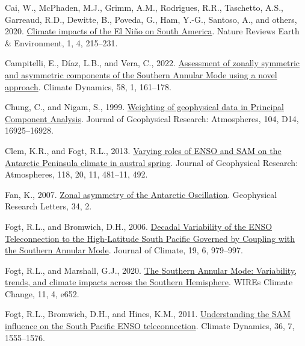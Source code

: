 \documentclass[12pt,oneside]{reedthesis}
\newlength{\cslhangindent}
\newenvironment{CSLReferences}[2] %
 {%
  \setlength{\parindent}{0pt}
  \ifodd #1 \everypar{\setlength{\hangindent}{\cslhangindent}}\ignorespaces\fi
  \ifnum #2 > 0
  \setlength{\parskip}{#2\baselineskip}
  \fi
 }%
 {}
\begin{document}
\begin{CSLReferences}{1}{0}
\leavevmode{}%
Cai, W., McPhaden, M.J., Grimm, A.M., Rodrigues, R.R., Taschetto, A.S., Garreaud, R.D., Dewitte, B., Poveda, G., Ham, Y.-G., Santoso, A., and others, 2020. \href{https://doi.org/10.1038/s43017-020-0040-3}{Climate impacts of the {El Niño} on {South America}}. Nature Reviews Earth \& Environment, 1, 4, 215--231.

\leavevmode{}%
Campitelli, E., Díaz, L.B., and Vera, C., 2022. \href{https://doi.org/10.1007/s00382-021-05896-5}{Assessment of zonally symmetric and asymmetric components of the {Southern Annular Mode} using a novel approach}. Climate Dynamics, 58, 1, 161--178.

\leavevmode{}%
Chung, C., and Nigam, S., 1999. \href{https://doi.org/10.1029/1999JD900234}{Weighting of geophysical data in {Principal Component Analysis}}. Journal of Geophysical Research: Atmospheres, 104, D14, 16925--16928.

\leavevmode{}%
Clem, K.R., and Fogt, R.L., 2013. \href{https://doi.org/10.1002/jgrd.50860}{Varying roles of {ENSO} and {SAM} on the {Antarctic Peninsula} climate in austral spring}. Journal of Geophysical Research: Atmospheres, 118, 20, 11, 481--11, 492.

\leavevmode{}%
Fan, K., 2007. \href{https://doi.org/10.1029/2006GL028045}{Zonal asymmetry of the {Antarctic Oscillation}}. Geophysical Research Letters, 34, 2.

\leavevmode{}%
Fogt, R.L., and Bromwich, D.H., 2006. \href{https://doi.org/10.1175/JCLI3671.1}{Decadal {Variability} of the {ENSO Teleconnection} to the {High-Latitude South Pacific Governed} by {Coupling} with the {Southern Annular Mode}}. Journal of Climate, 19, 6, 979--997.

\leavevmode{}%
Fogt, R.L., and Marshall, G.J., 2020. \href{https://doi.org/10.1002/wcc.652}{The {Southern Annular Mode}: {Variability}, trends, and climate impacts across the {Southern Hemisphere}}. WIREs Climate Change, 11, 4, e652.

\leavevmode{}%
Fogt, R.L., Bromwich, D.H., and Hines, K.M., 2011. \href{https://doi.org/10.1007/s00382-010-0905-0}{Understanding the {SAM} influence on the {South Pacific ENSO} teleconnection}. Climate Dynamics, 36, 7, 1555--1576.


\end{CSLReferences}
\end{document}
